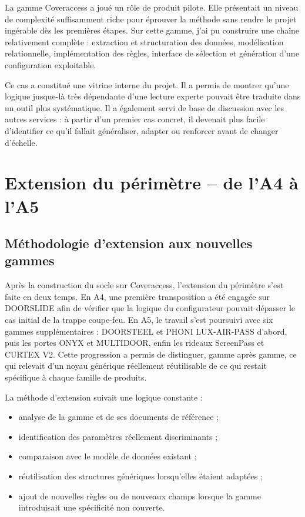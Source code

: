 La gamme Coveraccess a joué un rôle de produit pilote. Elle présentait un niveau de complexité suffisamment riche pour éprouver la méthode sans rendre le projet ingérable dès les premières étapes. Sur cette gamme, j'ai pu construire une chaîne relativement complète : extraction et structuration des données, modélisation relationnelle, implémentation des règles, interface de sélection et génération d'une configuration exploitable.

Ce cas a constitué une vitrine interne du projet. Il a permis de montrer qu'une logique jusque-là très dépendante d'une lecture experte pouvait être traduite dans un outil plus systématique. Il a également servi de base de discussion avec les autres services : à partir d'un premier cas concret, il devenait plus facile d'identifier ce qu'il fallait généraliser, adapter ou renforcer avant de changer d'échelle.

\section{Extension du périmètre -- de l'A4 à l'A5}

\subsection{Méthodologie d'extension aux nouvelles gammes}

Après la construction du socle sur Coveraccess, l'extension du périmètre s'est faite en deux temps. En A4, une première transposition a été engagée sur DOORSLIDE afin de vérifier que la logique du configurateur pouvait dépasser le cas initial de la trappe coupe-feu. En A5, le travail s'est poursuivi avec six gammes supplémentaires : DOORSTEEL et PHONI LUX-AIR-PASS d'abord, puis les portes ONYX et MULTIDOOR, enfin les rideaux ScreenPass et CURTEX V2. Cette progression a permis de distinguer, gamme après gamme, ce qui relevait d'un noyau générique réellement réutilisable de ce qui restait spécifique à chaque famille de produits.

La méthode d'extension suivait une logique constante :

\begin{itemize}[leftmargin=1.4cm]
\item analyse de la gamme et de ses documents de référence ;
\item identification des paramètres réellement discriminants ;
\item comparaison avec le modèle de données existant ;
\item réutilisation des structures génériques lorsqu'elles étaient adaptées ;
\item ajout de nouvelles règles ou de nouveaux champs lorsque la gamme introduisait une spécificité non couverte.
\end{itemize}

